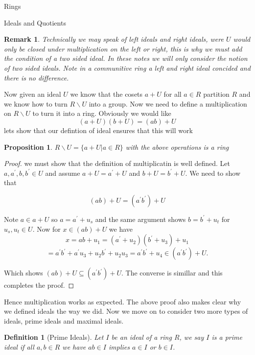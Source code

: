 \documentclass[11pt]{report}
\newcommand{\B }{\backslash}
\theoremstyle{break}
\newtheorem{defn}[thm]{Definition}
\newtheorem{prop}[thm]{Proposition}
\newtheorem{rem}[thm]{Remark}
\begin{document}
\begin{chapter}{Rings}
\begin{section}{Ideals and Quotients}
    
    \begin{rem}
        Technically we may speak of left ideals and right ideals, were $U$ would only be closed under multiplication on the left or right, this 
        is why we must add the condition of a two sided ideal. In these notes we will only consider the notion of two sided ideals. Note in 
        a communitive ring a left and right ideal concided and there is no difference. 
    \end{rem}

    Now given an ideal $U$ we know that the cosets $a + U$ for all $a \in R$ partition $R$ and we know how to turn $R\B U$ into a group. 
    Now we need to define a multiplication on $R\B U$ to turn it into a ring. Obviously we would like 
    \[(a + U)(b + U) = (ab) + U\]
    lets show that our defintion of ideal ensures that this will work 

    
    \begin{prop}
        $R\B  U = \{a + U| a \in R \}$ with the above operations is a ring
    \end{prop}
    \begin{proof}
        we must show that the definition of multiplicatin is well defined. Let $a, a^\prime, b, b^\prime \in U$ and assume 
        $a + U = a^\prime + U$ and $b + U = b^\prime + U$. We need to show that 

        \[(ab) + U = (a^\prime b^\prime) + U\]

        Note $a \in a + U$ so $a = a^\prime + u_s$ and the same argument shows $b = b^\prime + u_t$ for $u_s, u_t \in U$. 
        Now for $x \in (ab)+U$ we have 
        \[ x = ab + u_1 = (a^\prime + u_2)(b^\prime + u_3) + u_1   \]
        \[= a^\prime b^\prime + a^\prime u_3  + u_2b^\prime + u_2 u_3 = a^\prime b^\prime + u_4 \in (a^\prime b^\prime) + U.\] 

        Which shows $(ab) + U \subseteq (a^\prime b^\prime) + U$. The converse is simillar and this completes the proof. 
        
    \end{proof}

    Hence multiplication works as expected. The above proof also makes clear why we defined ideals the way we did. Now we move on to 
    consider two more types of ideals, prime ideals and maximal ideals. 

    
    \begin{defn}[Prime Ideals]
        Let $I$ be an ideal of a ring $R$, we say $I$ is a prime ideal if all $a, b \in R$ we have 
        $ab \in I$ implies $a \in I$ or $b \in I$. 
    \end{defn}


\end{section}
\end{chapter}
\end{document}

